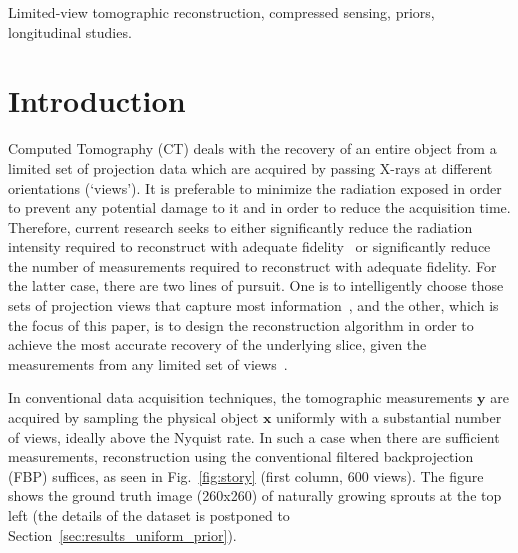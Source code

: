 \documentclass[journal]{IEEEtran}
\begin{document}
\begin{IEEEkeywords}
Limited-view tomographic reconstruction, compressed sensing, priors, longitudinal studies.
\end{IEEEkeywords}






%
\IEEEpeerreviewmaketitle



\section{Introduction}
\label{sec:intro}
Computed Tomography (CT) deals with the recovery of an entire object
from a limited set of projection data which are acquired by passing
X-rays at different orientations (`views'). It is preferable to
minimize the radiation exposed in order to prevent any potential
damage to it and in order to reduce the acquisition time. Therefore,
current research seeks to either significantly reduce the radiation
intensity required to reconstruct with adequate
fidelity~\cite{yang2018,Lin2016,Xie2017,gopal2019low} or significantly
reduce the number of measurements required to reconstruct with
adequate fidelity. For the latter case, there are two lines of
pursuit. One is to intelligently choose those sets of projection views
that capture most
information~\cite{King2018,Anthony2018,barkan17,fischer16,andrei14},
and the other, which is the focus of this paper, is to design the
reconstruction algorithm in order to achieve the most accurate
recovery of the underlying slice, given the measurements from any
limited set of views~\cite{yang2018,geyer2015,kilic2011}.

In conventional data acquisition techniques, the tomographic
measurements $\boldsymbol{y}$ are acquired by sampling the physical
object $\boldsymbol{x}$ uniformly with a substantial number of views,
ideally above the Nyquist rate. In such a case when there are
sufficient measurements, reconstruction using the conventional
filtered backprojection (FBP) suffices, as seen in
Fig.~\ref{fig:story} (first column, 600 views). The figure shows the
ground truth image (260x260) of naturally growing sprouts at the top
left (the details of the dataset is postponed to
Section~\ref{sec:results_uniform_prior}).
\end{document}
